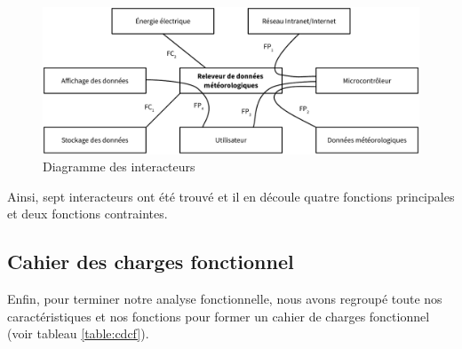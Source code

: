 \begin{figure}[!h]
	\centering
	\includegraphics[width=\linewidth]{Images/Diagramme_pieuvre}
	\caption{Diagramme des interacteurs}
\end{figure}

Ainsi, sept interacteurs ont été trouvé et il en découle quatre fonctions principales et deux fonctions contraintes.

\subsection{Cahier des charges fonctionnel}

Enfin, pour terminer notre analyse fonctionnelle, nous avons regroupé toute nos caractéristiques et nos fonctions pour former un cahier de charges fonctionnel (voir tableau \ref{table:cdcf}).

